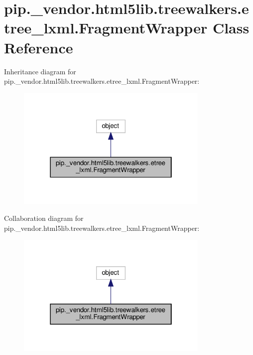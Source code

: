 \hypertarget{classpip_1_1__vendor_1_1html5lib_1_1treewalkers_1_1etree__lxml_1_1FragmentWrapper}{}\section{pip.\+\_\+vendor.\+html5lib.\+treewalkers.\+etree\+\_\+lxml.\+Fragment\+Wrapper Class Reference}
\label{classpip_1_1__vendor_1_1html5lib_1_1treewalkers_1_1etree__lxml_1_1FragmentWrapper}


Inheritance diagram for pip.\+\_\+vendor.\+html5lib.\+treewalkers.\+etree\+\_\+lxml.\+Fragment\+Wrapper\+:
\nopagebreak
\begin{figure}[H]
\begin{center}
\leavevmode
\includegraphics[width=262pt]{classpip_1_1__vendor_1_1html5lib_1_1treewalkers_1_1etree__lxml_1_1FragmentWrapper__inherit__graph}
\end{center}
\end{figure}


Collaboration diagram for pip.\+\_\+vendor.\+html5lib.\+treewalkers.\+etree\+\_\+lxml.\+Fragment\+Wrapper\+:
\nopagebreak
\begin{figure}[H]
\begin{center}
\leavevmode
\includegraphics[width=262pt]{classpip_1_1__vendor_1_1html5lib_1_1treewalkers_1_1etree__lxml_1_1FragmentWrapper__coll__graph}
\end{center}
\end{figure}
